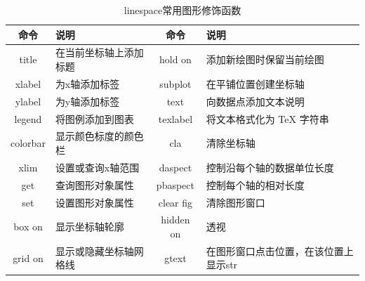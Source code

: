         \begin{table}[H]
        \caption{linespace常用图形修饰函数}
        \label{tab:linespace常用图形修饰函数}
        \centering
        \begin{tabular}{c l c l}
            \toprule
            命令 & 说明 & 命令 & 说明 \\
            \midrule
            title & 在当前坐标轴上添加标题 & hold on & 添加新绘图时保留当前绘图\\
            xlabel & 为x轴添加标签      &subplot & 在平铺位置创建坐标轴\\
            ylabel & 为y轴添加标签     &text  & 向数据点添加文本说明\\
            legend & 将图例添加到图表&texlabel   & 将文本格式化为 TeX 字符串\\
            colorbar & 显示颜色标度的颜色栏&cla & 清除坐标轴\\
            xlim & 设置或查询x轴范围&daspect & 控制沿每个轴的数据单位长度\\
            get & 查询图形对象属性&pbaspect  & 控制每个轴的相对长度\\
            set & 设置图形对象属性&clear fig & 清除图形窗口\\
            box on  & 显示坐标轴轮廓&hidden on & 透视\\
            grid on & 显示或隐藏坐标轴网格线&gtext & 在图形窗口点击位置，在该位置上显示str\\
            \bottomrule
        \end{tabular}
        \end{table}
